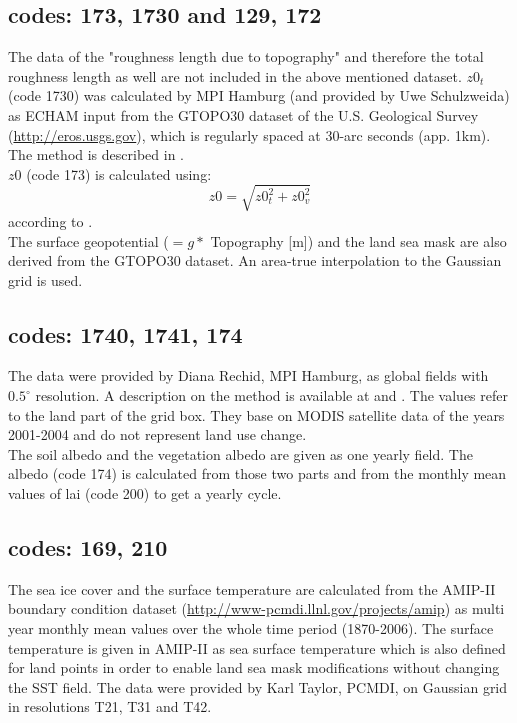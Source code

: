 \subsection{codes: 173, 1730 \hspace{1.ex} and 129, 172}
The data of the "roughness length due to topography" and therefore the total roughness length as well are not
included in the above mentioned dataset. $z0_t$ (code 1730) was calculated by MPI Hamburg (and provided by Uwe Schulzweida)
as ECHAM input from the GTOPO30 dataset of the U.S. Geological Survey (\url{http://eros.usgs.gov}), which is regularly spaced
 at 30-arc seconds (app. 1km). The method is described in \cite{tibaldi1981}.\\
$z0$ (code 173) is calculated using:
\begin{equation}
{z0} = \sqrt{z0_t^{2} + z0_v^{2}}
\label{r0_eq}
\end{equation}
according to \cite{hagemann1999}.\\
The surface geopotential ($= g *$ Topography [m]) and the land sea mask are also derived from the GTOPO30 dataset. 
An area-true interpolation to the Gaussian grid is used.

\subsection{codes: 1740, 1741, 174}
The data were provided by Diana Rechid, MPI Hamburg, as global fields with $0.5^\circ$ resolution. 
A description on the method is available at \cite{rechid2009} and \cite{rechid2008}. The values 
refer to the land part of the grid box. They base on MODIS satellite data of the years 2001-2004 
and do not represent land use change.\\
The soil albedo and the vegetation albedo are given as one yearly field. The albedo (code 174) is
calculated from those two parts and from the monthly mean values of lai (code 200) to get a 
yearly cycle.

\subsection{codes: 169, 210}
The sea ice cover and the surface temperature are calculated from the AMIP-II boundary condition dataset 
(\url{http://www-pcmdi.llnl.gov/projects/amip}) as multi year monthly mean values over the whole time period (1870-2006).
The surface temperature is given in AMIP-II as sea surface temperature which is also defined for 
land points in order to enable land sea mask modifications without changing the SST field.
The data were provided by Karl Taylor, PCMDI, on Gaussian grid in resolutions T21, T31 and T42.

